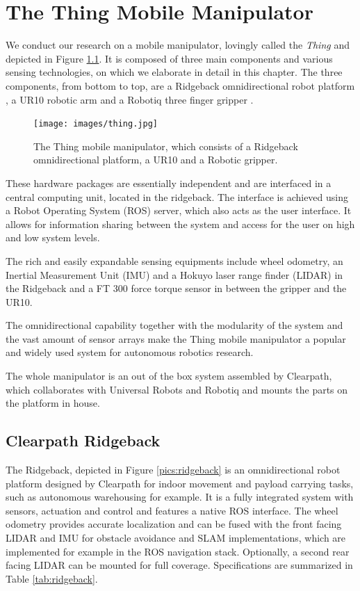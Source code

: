 \chapter{The Thing Mobile Manipulator}
We conduct our research on a mobile manipulator, lovingly called the \emph{Thing} and depicted in Figure \ref{pics:thing}. It is composed of three main components and various sensing technologies, on which we elaborate in detail in this chapter. The three components, from bottom to top, are a Ridgeback omnidirectional robot platform \citep{ridgeback}, a UR10 robotic arm \citep{ur10} and a Robotiq three finger gripper \citep{robotiqGripper}.

\begin{figure}[h]
   \centering
   \texttt{[image: images/thing.jpg]}
   \caption{The Thing mobile manipulator, which consists of a Ridgeback omnidirectional platform, a UR10 and a Robotic gripper.}
   \label{pics:thing}
\end{figure}

These hardware packages are essentially independent and are interfaced in a central computing unit, located in the ridgeback. The interface is achieved using a Robot Operating System (ROS) server, which also acts as the user interface. It allows for information sharing between the system and access for the user on high and low system levels.

The rich and easily expandable sensing equipments include wheel odometry, an Inertial Measurement Unit (IMU) and a Hokuyo laser range finder (LIDAR) \citep{hokuyo} in the Ridgeback and a FT 300 force torque sensor \citep{robotiqFT300} in between the gripper and the UR10.

The omnidirectional capability together with the modularity of the system and the vast amount of sensor arrays make the Thing mobile manipulator a popular and widely used system for autonomous robotics research.

The whole manipulator is an out of the box system assembled by Clearpath, which collaborates with Universal Robots and Robotiq and mounts the parts on the platform in house.

\section{Clearpath Ridgeback}
	\label{sec:ridgeback}
The Ridgeback, depicted in Figure \ref{pics:ridgeback} is an omnidirectional robot platform designed by Clearpath for indoor movement and payload carrying tasks, such as autonomous warehousing for example. It is a fully integrated system with sensors, actuation and control and features a native ROS interface. The wheel odometry provides accurate localization and can be fused with the front facing LIDAR and IMU for obstacle avoidance and SLAM implementations, which are implemented for example in the ROS navigation stack. Optionally, a second rear facing LIDAR can be mounted for full \unit[360]{\textdegree} coverage. Specifications are summarized in Table \ref{tab:ridgeback}.


